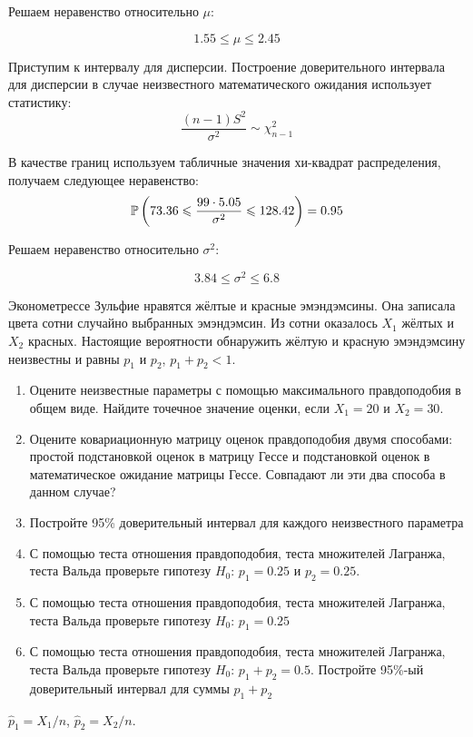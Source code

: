\begin{problem}
\begin{sol}
\begin{enumerate}
Решаем неравенство относительно $\mu$:

\[1.55 \leqslant \mu \leqslant 2.45\]


Приступим к интервалу для дисперсии. Построение доверительного интервала для дисперсии в случае неизвестного математического ожидания использует статистику:
\[\frac{\left(n-1\right)S^2}{\sigma^2} \sim \chi^2_{n-1}\]

В качестве границ используем табличные значения хи-квадрат распределения, получаем следующее неравенство:
\[\P\left( 73.36 \leqslant \frac{99\cdot5.05}{\sigma^2} \leqslant 128.42 \right) = 0.95 \]

Решаем неравенство относительно $\sigma^2$:

\[3.84 \leqslant \sigma^2 \leqslant 6.8\]
\end{enumerate}
\end{sol}
\end{problem}


\begin{problem}
\useR Эконометрессе Зульфие нравятся жёлтые и красные эмэндэмсины. Она записала цвета сотни случайно выбранных эмэндэмсин. Из сотни оказалось $X_1$ жёлтых и $X_2$ красных. Настоящие вероятности обнаружить жёлтую и красную эмэндэмсину неизвестны и равны $p_1$ и $p_2$, $p_1+p_2<1$.

\begin{enumerate}
\item Оцените неизвестные параметры с помощью максимального правдоподобия в общем виде. Найдите точечное значение оценки, если $X_1=20$ и $X_2=30$.
\item Оцените ковариационную матрицу оценок правдоподобия двумя способами: простой подстановкой оценок в матрицу Гессе и подстановкой оценок в математическое ожидание матрицы Гессе. Совпадают ли эти два способа в данном случае?
\item Постройте 95\% доверительный интервал для каждого неизвестного параметра
\item С помощью теста отношения правдоподобия, теста множителей Лагранжа, теста Вальда проверьте гипотезу $H_0$: $p_1=0.25$ и $p_2=0.25$.
\item С помощью теста отношения правдоподобия, теста множителей Лагранжа, теста Вальда проверьте гипотезу $H_0$: $p_1=0.25$
\item С помощью теста отношения правдоподобия, теста множителей Лагранжа, теста Вальда проверьте гипотезу $H_0$: $p_1+p_2=0.5$. Постройте 95\%-ый доверительный интервал для суммы $p_1+p_2$
\end{enumerate}



\begin{sol}
$\hat{p}_1=X_1/n$, $\hat{p}_2=X_2/n$.
\end{sol}
\end{problem}




